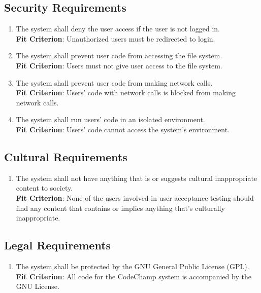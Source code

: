 \documentclass[12pt, titlepage]{article}
\begin{document}
\subsection{Security Requirements}
\begin{enumerate}[label=NFR.\arabic*, resume]
    \item The system shall deny the user access if the user is not logged in. \label{NFR.7}
    \\\textbf{Fit Criterion}: Unauthorized users must be redirected to login.
    \item The system shall prevent user code from accessing the file system.\label{NFR.8}
    \\\textbf{Fit Criterion}: Users must not give user access to the file system.
    \item The system shall prevent user code from making network calls.\label{NFR.9}
     \\\textbf{Fit Criterion}: Users' code with network calls is blocked from making network calls.
    \item The system shall run users' code in an isolated environment.\label{NFR.10}
    \\\textbf{Fit Criterion}: Users' code cannot access the system's environment.
\end{enumerate}
\subsection{Cultural Requirements}
\begin{enumerate}[label=NFR.\arabic*, resume]
    \item The system shall not have anything that is or suggests cultural inappropriate content to society. \label{NFR.11}
    \\\textbf{Fit Criterion}: None of the users involved in user acceptance testing should find any content that contains or implies anything that's culturally inappropriate.
\end{enumerate}
\subsection{Legal Requirements}
\begin{enumerate}[label=NFR.\arabic*, resume]
    \item The system shall be protected by the GNU General Public License (GPL). \label{NFR.12}
    \\\textbf{Fit Criterion}: All code for the CodeChamp system is accompanied by the GNU License.
\end{enumerate}
\end{document}

